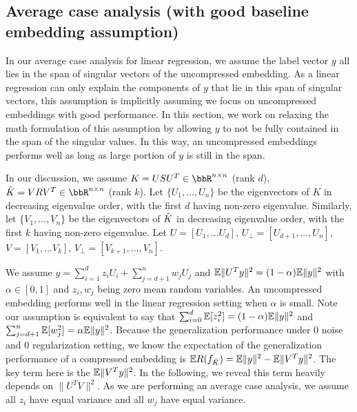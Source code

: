 \documentclass[12pt]{article}
\begin{document}
\subsection{Average case analysis (with good baseline embedding assumption)}
\label{subsec:average}

In our average case analysis for linear regression, we assume the label vector $y$ all lies in the span of singular vectors of the uncompressed embedding. As a linear regression can only explain the components of $y$ that lie in this span of singular vectors, this assumption is implicitly assuming we focus on uncompressed embeddings with good performance. In this section, we work on relaxing the math formulation of this assumption by allowing $y$ to not be fully contained in the span of the singular values. In this way, an uncompressed embeddings performs well as long as large portion of $y$ is still in the span. 

In our discussion, we assume $K = USU^T \in \RR^{n \times n}$ (rank $d$), $\tK = VRV^T\in \RR^{n \times n}$ (rank $k$).
Let $\{U_1,\ldots,U_n\}$ be the eigenvectors of $K$ in decreasing eigenvalue order, with the first $d$ having non-zero eigenvalue.
Similarly, let $\{V_1,\ldots,V_n\}$ be the eigenvectors of $\tK$ in decreasing eigenvalue order, with the first $k$ having non-zero eigenvalue.
Let $U = [U_1,\ldots U_d]$, $U_{\perp} = [U_{d+1},\ldots,U_n]$, $V = [V_1,\ldots V_k]$, $V_{\perp} = [V_{k+1},\ldots,V_n]$.

We assume $y = \sum_{i=1}^d z_i U_i + \sum_{j=d+1}^n w_j U_{j}$ and $\E\| U^{T} y \|^2 = (1-\alpha) \E \| y \|^2$ with $\alpha\in[0, 1]$ and $z_i, w_j$ being zero mean random variables. An uncompressed embedding performs well in the linear regression setting when $\alpha$ is small. Note our assumption is equivalent to say that $\sum_{i=0}^d \E[z_i^2] = (1-\alpha)\E \| y\|^2$ and $\sum_{j=d+1}^n \E[w_j^2] = \alpha \E \| y\|^2$. Because the generalization performance under 0 noise and 0 regularization setting, we know the expectation of the generalization performance of a compressed embedding is $\E R(f_{\tK}) = \E \| y \|^2 - \E \|V^T y \|^2$. The key term here is the $\E \|V^T y \|^2$. In the following, we reveal this term heavily depends on $\|U^T V \|^2$. As we are performing an average case analysis, we assume all $z_i$ have equal variance and all $w_j$ have equal variance.
\end{document}
